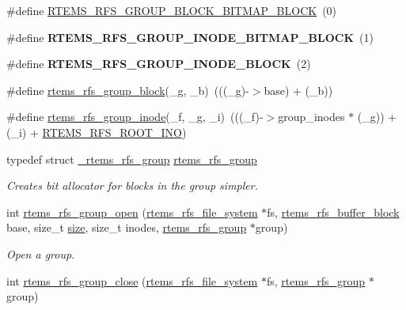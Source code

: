\begin{DoxyCompactItemize}
\item 
\#define \mbox{\hyperlink{group__rtems__rfs_gae19b35893a0007cd08b549200e317b9e}{R\+T\+E\+M\+S\+\_\+\+R\+F\+S\+\_\+\+G\+R\+O\+U\+P\+\_\+\+B\+L\+O\+C\+K\+\_\+\+B\+I\+T\+M\+A\+P\+\_\+\+B\+L\+O\+CK}}~(0)
\item 
\#define {\bfseries R\+T\+E\+M\+S\+\_\+\+R\+F\+S\+\_\+\+G\+R\+O\+U\+P\+\_\+\+I\+N\+O\+D\+E\+\_\+\+B\+I\+T\+M\+A\+P\+\_\+\+B\+L\+O\+CK}~(1)
\item 
\#define {\bfseries R\+T\+E\+M\+S\+\_\+\+R\+F\+S\+\_\+\+G\+R\+O\+U\+P\+\_\+\+I\+N\+O\+D\+E\+\_\+\+B\+L\+O\+CK}~(2)
\item 
\#define \mbox{\hyperlink{group__rtems__rfs_gad8e415ce1837c044b5f079c520b00366}{rtems\+\_\+rfs\+\_\+group\+\_\+block}}(\+\_\+g,  \+\_\+b)~(((\+\_\+g)-\/$>$base) + (\+\_\+b))
\item 
\#define \mbox{\hyperlink{group__rtems__rfs_ga74d3313e202ae23fcb1f4c4e58b49032}{rtems\+\_\+rfs\+\_\+group\+\_\+inode}}(\+\_\+f,  \+\_\+g,  \+\_\+i)~(((\+\_\+f)-\/$>$group\+\_\+inodes $\ast$ (\+\_\+g)) + (\+\_\+i) + \mbox{\hyperlink{rtems-rfs-file-system_8h_a341dd2280c086baadd35b5e4471ff416}{R\+T\+E\+M\+S\+\_\+\+R\+F\+S\+\_\+\+R\+O\+O\+T\+\_\+\+I\+NO}})
\item 
typedef struct \mbox{\hyperlink{struct__rtems__rfs__group}{\+\_\+rtems\+\_\+rfs\+\_\+group}} \mbox{\hyperlink{group__rtems__rfs_ga0e7b27c60e21039ef07a8c843fa8a3e5}{rtems\+\_\+rfs\+\_\+group}}
\begin{DoxyCompactList}\small\item\em Creates bit allocator for blocks in the group simpler. \end{DoxyCompactList}\item 
int \mbox{\hyperlink{group__rtems__rfs_gac8ab81ba00e5100d7f755ff951b28a83}{rtems\+\_\+rfs\+\_\+group\+\_\+open}} (\mbox{\hyperlink{struct__rtems__rfs__file__system}{rtems\+\_\+rfs\+\_\+file\+\_\+system}} $\ast$fs, \mbox{\hyperlink{rtems-rfs-buffer_8h_a5650d53328a5af0a78198fe780aec043}{rtems\+\_\+rfs\+\_\+buffer\+\_\+block}} base, size\+\_\+t \mbox{\hyperlink{sun4u_2tte_8h_a245260f6f74972558f61b85227df5aae}{size}}, size\+\_\+t inodes, \mbox{\hyperlink{group__rtems__rfs_ga0e7b27c60e21039ef07a8c843fa8a3e5}{rtems\+\_\+rfs\+\_\+group}} $\ast$group)
\begin{DoxyCompactList}\small\item\em Open a group. \end{DoxyCompactList}\item 
int \mbox{\hyperlink{group__rtems__rfs_ga5f2a47d06d6a8209b182348b7b38f91d}{rtems\+\_\+rfs\+\_\+group\+\_\+close}} (\mbox{\hyperlink{struct__rtems__rfs__file__system}{rtems\+\_\+rfs\+\_\+file\+\_\+system}} $\ast$fs, \mbox{\hyperlink{group__rtems__rfs_ga0e7b27c60e21039ef07a8c843fa8a3e5}{rtems\+\_\+rfs\+\_\+group}} $\ast$group)

\end{DoxyCompactItemize}
